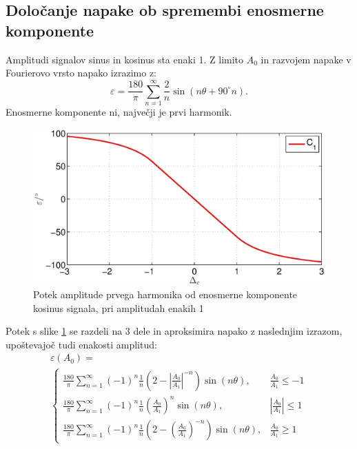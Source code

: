 \documentclass[a4paper]{article}
\begin{document}
\subsection{Določanje napake ob spremembi enosmerne komponente}
Amplitudi signalov sinus in kosinus sta enaki 1.
Z limito $A_0$ in razvojem napake v Fourierovo vrsto napako izrazimo z:
\begin{equation}
\label{equ:off_lim_vrsta}
\varepsilon = \frac{180}{\pi}\sum_{n=1}^{\infty}\frac{2}{n} \sin (n \theta+ 90^\circ n).
\end{equation}
Enosmerne komponente ni,  največji je prvi harmonik.
\begin{figure}[!htb]
	\begin{center}
		\includegraphics[width=\linewidth]{./Slike/off.eps}
		\caption{Potek amplitude prvega harmonika od enosmerne komponente kosinus signala, pri amplitudah enakih 1} \label{fig:off}
	\end{center}
\end{figure}
Potek s slike \ref{fig:off} se razdeli na 3 dele in aproksimira napako z naslednjim izrazom, upoštevajoč tudi enakosti amplitud:
\begin{multline}
\label{equ:offc_err}
\varepsilon(A_0)=\\
\begin{cases}
\frac{180}{\pi}\sum_{n=1}^{\infty}(-1)^n\frac{1}{n}(2-|\frac{A_0}{A_1}|^{-n}) \sin (n \theta ), & \frac{A_0}{A_1}\leq -1 \\
\frac{180}{\pi}\sum_{n=1}^{\infty}(-1)^n\frac{1}{n}(\frac{A_0}{A_1})^n \sin (n \theta ), & |\frac{A_0}{A_1}|\leq 1 \\
\frac{180}{\pi}\sum_{n=1}^{\infty}(-1)^n\frac{1}{n}(2-(\frac{A_0}{A_1})^{-n}) \sin (n \theta ), & \frac{A_0}{A_1}\geq 1
\end{cases}
\end{multline}
\end{document}
